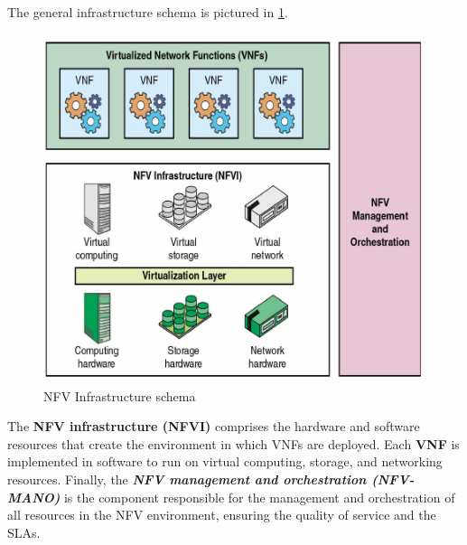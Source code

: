 \documentclass[10pt,a4paper]{report}
\theoremstyle{definition}
\begin{document}
The general infrastructure schema is pictured in \ref{nfv-arch-schema}.
\begin{figure}[h]
	\centering\includegraphics[scale=0.50]{images/Pasted image 20230405171948.png}
	\caption{NFV Infrastructure schema}
\label{nfv-arch-schema}
\end{figure}


The \textbf{NFV infrastructure (NFVI)} comprises the hardware and software resources that create the environment in which VNFs are deployed. Each \textbf{VNF} is implemented in software to run on virtual computing, storage, and networking resources. Finally, the \textit{\textbf{NFV management and orchestration (NFV-MANO)}}  is the component responsible for the management and orchestration of all resources in the NFV environment, ensuring the quality of service and the SLAs.
\end{document}
